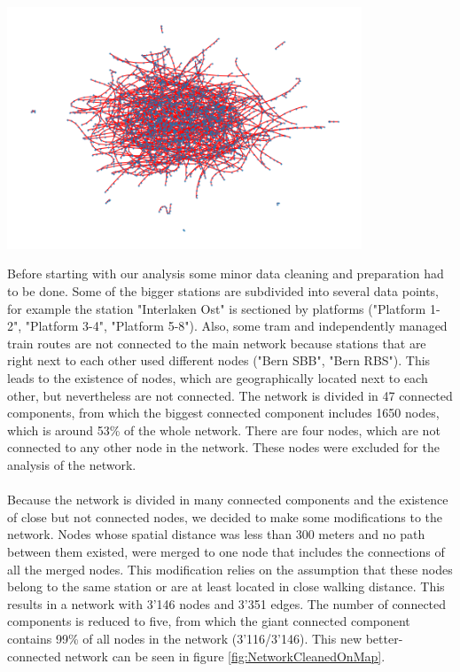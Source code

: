 \documentclass{Resources/netsci-project}
\begin{document}
\begin{center}
    \centering
    \includegraphics[width=300pt]{Resources/Network_no_map}
    \label{fig:NetworkNoMap}
\end{center}
\noindent
Before starting with our analysis some minor data cleaning and preparation had to be done. Some of the bigger stations are subdivided into several data points, for example the station "Interlaken Ost" is sectioned by platforms ("Platform 1-2", "Platform 3-4", "Platform 5-8"). Also, some tram and independently managed train routes are not connected to the main network because stations that are right next to each other used different nodes ("Bern SBB", "Bern RBS"). This leads to the existence of nodes, which are geographically located next to each other, but nevertheless are not connected. The network is divided in 47 connected components, from which the biggest connected component includes 1650 nodes, which is around 53\% of the whole network. There are four nodes, which are not connected to any other node in the network. These nodes were excluded for the analysis of the network.
\\~\\
Because the network is divided in many connected components and the existence of close but not connected nodes, we decided to make some modifications to the network. Nodes whose spatial distance was less than 300 meters and no path between them existed, were merged to one node that includes the connections of all the merged nodes. This modification relies on the assumption that these nodes belong to the same station or are at least located in close walking distance. This results in a network with 3'146 nodes and 3'351 edges. The number of connected components is reduced to five, from which the giant connected component contains 99\% of all nodes in the network (3’116/3’146). This new better-connected network can be seen in figure \ref{fig:NetworkCleanedOnMap}.
\end{document}
